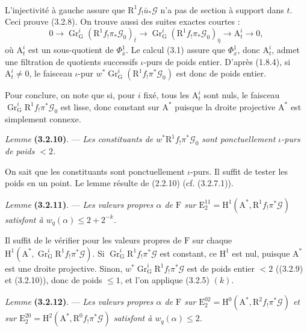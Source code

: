 \documentclass[11pt,leqno]{article}
\newcommand{\Page}[1]{\ifvmode\noindent\else\unskip\ \fi{\footnotesize\textcolor{gray}{[p.\,#1]}}\ \ignorespaces}
\begin{document}
\Page{203}

L’injectivité à gauche assure que \(\mathrm{R}^1f_!\bar{u}_*\mathscr{G}\) n’a pas de section à support dans \(t\). Ceci prouve (3.2.8). On trouve aussi des suites exactes courtes :
\[
0\to\operatorname{Gr}_{\mathrm{G}}^i
(\mathrm{R}^1f_!\pi_*\mathscr{G}_0)_{\bar{t}}
\to\operatorname{Gr}_{\mathrm{G}}^i
(\mathrm{R}^1f_!\pi_*\mathscr{G}_0)_{\bar{\eta}}
\to\mathrm{A}_t^i\to0,
\]
où \(\mathrm{A}_t^i\) est un sous-quotient de \(\Phi_{\bar{x}}^1\). Le calcul (3.1) assure que \(\Phi_{\bar{x}}^1\), donc \(\mathrm{A}_t^i\), admet une filtration de quotients successifs \(\iota\)-purs de poids entier. D’après (1.8.4), si \(\mathrm{A}_t^i\neq0\), le faisceau \(\iota\)-pur \(w^*\operatorname{Gr}_{\mathrm{G}}^i(\mathrm{R}^1f_!\pi^*\mathscr{G}_0)\) est donc de poids entier.

Pour conclure, on note que si, pour \(i\) fixé, tous les \(\mathrm{A}_t^i\) sont nuls, le faisceau \(\operatorname{Gr}_{\mathrm{G}}^i\mathrm{R}^1f_!\pi^*\mathscr{G}_0\) est lisse, donc constant sur \(\mathrm{A}^*\) puisque la droite projective \(\mathrm{A}^*\) est simplement connexe.

\textit{Lemme} \textbf{(3.2.10)}. — \textit{Les constituants de \(w^*\mathrm{R}^1f_!\pi^*\mathscr{G}_0\) sont ponctuellement \(\iota\)-purs de poids \(<2\).}

On sait que les constituants sont ponctuellement \(\iota\)-purs. Il suffit de tester les poids en un point. Le lemme résulte de (2.2.10) (cf. (3.2.7.1)).

\textit{Lemme} \textbf{(3.2.11)}. — \textit{Les valeurs propres \(\alpha\) de \(\mathrm{F}\) sur \(\mathrm{E}_2^{11}=\mathrm{H}^1(\mathrm{A}^*,\mathrm{R}^1f_!\pi^*\mathscr{G})\) satisfont à \(w_q(\alpha)\leq2+2^{-k}\).}

Il suffit de le vérifier pour les valeurs propres de \(\mathrm{F}\) sur chaque \(\mathrm{H}^1(\mathrm{A}^*,\operatorname{Gr}_{\mathrm{G}}^i\mathrm{R}^1f_!\pi^*\mathscr{G})\). Si \(\operatorname{Gr}_{\mathrm{G}}^i\mathrm{R}^1f_!\pi^*\mathscr{G}\) est constant, ce \(\mathrm{H}^1\) est nul, puisque \(\mathrm{A}^*\) est une droite projective. Sinon, \(w^*\operatorname{Gr}_{\mathrm{G}}^i\mathrm{R}^1f_!\pi^*\mathscr{G}\) est de poids entier \(<2\) ((3.2.9) et (3.2.10)), donc de poids \(\leq1\), et l’on applique (3.2.5) \((k)\).

\textit{Lemme} \textbf{(3.2.12)}. — \textit{Les valeurs propres \(\alpha\) de \(\mathrm{F}\) sur \(\mathrm{E}_2^{02}=\mathrm{H}^0(\mathrm{A}^*,\mathrm{R}^2f_!\pi^*\mathscr{G})\) et sur \(\mathrm{E}_2^{20}=\mathrm{H}^2(\mathrm{A}^*,\mathrm{R}^0f_!\pi^*\mathscr{G})\) satisfont à \(w_q(\alpha)\leq2\).}
\end{document}
